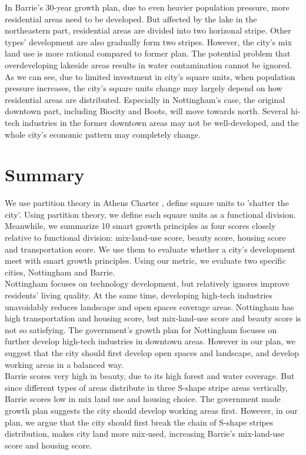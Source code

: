 In Barrie's 30-year growth plan, due to even heavier population pressure, more residential areas need to be developed. But affected by the lake in the northeastern part, residential areas are divided into two horizonal stripe. Other types' development are also gradually form two stripes. However, the city's mix land use is more rational compared to former plan. The potential problem that overdeveloping lakeside areas results in water contamination cannot be ignored.\\

As we can see, due to limited investment in city's square units, when population pressure increases, the city's square units change may largely depend on how residential areas are distributed. Especially in Nottingham's case, the original downtown part, including Biocity and Boots, will move towards north. Several hi-tech industries in the former downtown areas may not be well-developed, and the whole city's economic pattern may completely change.

\section{Summary}
We use partition theory in Athens Charter \cite{conf:The-Athens-Charter}, define square units to 'shatter the city'. Using partition theory, we define each square units as a functional division.
Meanwhile, we summarize 10 smart growth principles as four scores closely relative to functional division: mix-land-use score, beauty score, housing score and transportation score. We use them to evaluate whether a city's development meet with smart growth principles.
Using our metric, we evaluate two specific cities, Nottingham and Barrie.\\

Nottingham focuses on technology development, but relatively ignores improve residents' living quality. At the same time, developing high-tech industries unavoidably reduces landscape and open spaces coverage areas. Nottingham has high transportation and housing score, but mix-land-use score and beauty score is not so satisfying.
The government's growth plan for Nottingham focuses on further develop high-tech industries in downtown areas. However in our plan, we suggest that the city should first develop open spaces and landscape, and develop working areas in a balanced way.\\

Barrie scores very high in beauty, due to its high forest and water coverage. But since different types of areas distribute in three S-shape stripe areas vertically, Barrie scores low in mix land use and housing choice.
The government made growth plan suggests the city should develop working areas first. However, in our plan, we argue that the city should first break the chain of S-shape stripes distribution, makes city land more mix-used, increasing Barrie's mix-land-use score and housing score.\\

